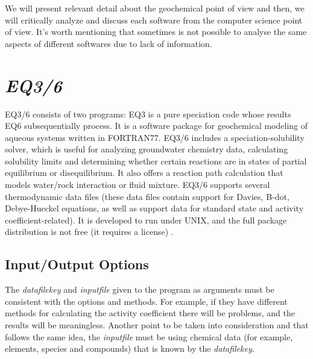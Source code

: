 We will present relevant detail about the geochemical point of view and then, we will critically analyze and discuss each software from the computer science point of view. It's worth mentioning that sometimes is not possible to analyse the same aspects of different softwares due to lack of information.



\section{\emph{EQ3/6}}
EQ3/6 consists of two programs: EQ3 is a pure speciation code whose results EQ6 subsequentially process. It is a software package for geochemical modeling of aqueous systems written in FORTRAN77. EQ3/6 includes a speciation-solubility solver, which is useful for analyzing groundwater chemistry data, calculating solubility limits and determining whether certain reactions are in states of partial equilibrium or disequilibrium. It also offers a reaction path calculation that models water/rock interaction or fluid mixture. EQ3/6 supports several thermodynamic data files (these data files contain support for Davies, B-dot, Debye-Hueckel equations, as well as support data for standard state and activity coefficient-related). It is developed to run under UNIX, and the full package distribution is not free (it requires a license) \cite{Wolery:79} \cite{Wolery:90} \cite{Wolery:92}.

\subsection{Input/Output Options}
The \emph{datafilekey} and \emph{inputfile} given to the program as arguments must be consistent with the options and methods. For example, if they have different methods for calculating the activity coefficient there will be problems, and the results will be meaningless. Another point to be taken into consideration and that follows the same idea, the \emph{inputfile} must be using chemical data (for example, elements, species and compounds) that is known by the \emph{datafilekey}.

